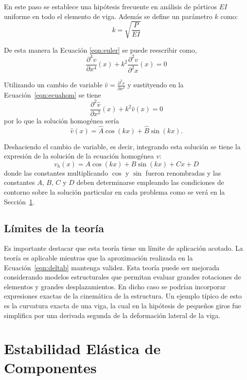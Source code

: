 En este paso se establece una hipótesis frecuente en análisis de pórticos $EI$ uniforme en todo el elemento de viga. %
%
Además se define un parámetro $k$ como:
%
\begin{equation}\label{eqn:defk}
k = \sqrt{\frac{P}{EI}}
\end{equation}

De esta manera la Ecuación \eqref{eqn:euler} se puede reescribir como,
\begin{equation}\label{eqn:ecuahom}
\boxed{
\frac{\partial^4 v}{\partial x^4}(x) + k^2 \frac{\partial^2 v}{\partial^2 x}(x) = 0
}
\end{equation}

Utilizando un cambio de variable $\hat{v}=\frac{\partial^2 v}{\partial x^2}$ y sustityendo en la Ecuación~\eqref{eqn:ecuahom} se tiene
$$
\frac{\partial^2 \hat{v}}{\partial x^2}(x) + k^2 \hat{v}(x) = 0
$$
por lo que la solución homogénea sería
$$
\hat{v}(x) = \hat{A} \cos (kx) + \hat{B} \sin (kx).
$$

Deshaciendo el cambio de variable, es decir, integrando esta solución se tiene la expresión de la solución de la ecuación homogénea $v$:
%
\begin{equation}
v_h(x) = A \cos (kx) + B \sin (kx) + Cx + D
\end{equation}
%
donde las constantes multiplicando $\cos$ y $\sin$ fueron renombradas y las constantes $A$, $B$, $C$ y $D$ deben determinarse empleando las condiciones de contorno sobre la solución particular en cada problema como se verá en la Sección~\ref{sec:componentes}.


\subsection{Límites de la teoría}

Es importante destacar que esta teoría tiene un límite de aplicación acotado. La teoría es aplicable mientras que la aproximación realizada en la Ecuación~\ref{eqn:deltab} mantenga validez. %
%
Esta teoría puede ser mejorada considerando modelos estructurales que permitan evaluar grandes rotaciones de elementos y grandes desplazamientos. En dicho caso se podrían incorporar expresiones exactas de la cinemática de la estructura. %
%
Un ejemplo típico de esto es la curvatura exacta de una viga, la cual en la hipótesis de pequeños giros fue simplifica por una derivada segunda de la deformación lateral de la viga.


\section{Estabilidad Elástica de Componentes} \label{sec:componentes}

